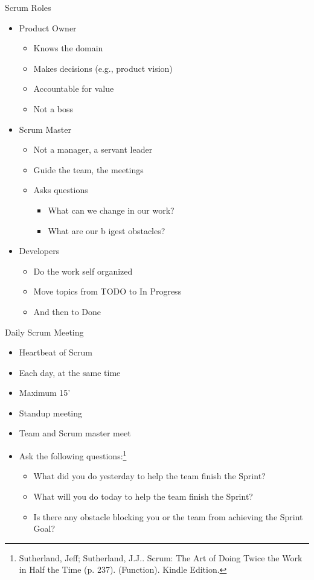 \begin{frame}[fragile]{Scrum Roles}
\begin{itemize}
\item Product Owner
\begin{itemize}
\item Knows the domain
\item Makes decisions (e.g., product vision)
\item Accountable for value
\item Not a boss
\end{itemize}
\item Scrum Master
\begin{itemize}
\item Not a manager, a servant leader
\item Guide the team, the meetings
\item Asks questions
\begin{itemize}
\item What can we change in our work?
\item What are our b igest obstacles?
\end{itemize}
\end{itemize}
\item Developers
\begin{itemize}
\item Do the work self organized
\item Move topics from TODO to In Progress
\item And then to Done
\end{itemize}
\end{itemize}
\end{frame}

\begin{frame}[fragile]{Daily Scrum Meeting}
\begin{itemize}
\item Heartbeat of Scrum
\item Each day, at the same time
\item Maximum 15'
\item Standup meeting
\item Team and Scrum master meet
\item Ask the following questions:\footnote{Sutherland, Jeff; Sutherland, J.J.. Scrum: The Art of Doing Twice the Work in Half the Time (p. 237). (Function). Kindle Edition.}
\begin{itemize}
\item What did you do yesterday to help the team finish the Sprint?
\item What will you do today to help the team finish the Sprint?
\item Is there any obstacle blocking you or the team from achieving the Sprint Goal?
\end{itemize}
\end{itemize}
\end{frame}

